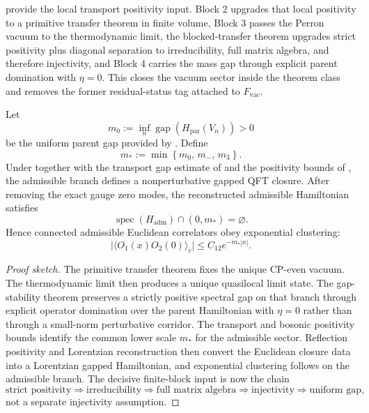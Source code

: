 \begin{remark}
\label{rem:vacuum-honest-status}
 provide the local transport
positivity input. Block 2 upgrades that local positivity to a primitive transfer theorem in finite
volume, Block 3 passes the Perron vacuum to the thermodynamic limit, the blocked-transfer theorem
upgrades strict positivity plus diagonal separation to irreducibility, full matrix algebra, and
therefore injectivity, and Block 4 carries the mass gap through explicit parent domination with
$\eta=0$. This closes the vacuum sector inside the theorem class and removes the former
residual-status tag attached to $F_{\mathrm{vac}}$.
\end{remark}

\begin{theorem}
\label{thm:nonperturbative-admissible-qft}
Let
\[
m_0:=\inf_n \operatorname{gap}(H_{\mathrm{par}}(V_n))>0
\]
be the uniform parent gap provided by . Define
\[
m_*:=\min\left\{m_0,\,m_-,\,m_3\right\}.
\]
Under 
together with the transport gap estimate of  and the positivity
bounds of , the admissible branch defines a nonperturbative
gapped QFT closure. After removing the exact gauge zero modes, the reconstructed admissible
Hamiltonian satisfies
\[
\operatorname{spec}(H_{\mathrm{adm}})\cap(0,m_*)=\varnothing.
\]
Hence connected admissible Euclidean correlators obey exponential clustering:
\[
\bigl|\langle O_1(x)O_2(0)\rangle_c\bigr|
\le
C_{12}e^{-m_*|x|}.
\]
\end{theorem}

\begin{proof}[Proof sketch]
The primitive transfer theorem fixes the unique CP-even vacuum. The thermodynamic limit then
produces a unique quasilocal limit state. The gap-stability theorem preserves a strictly positive
spectral gap on that branch through explicit operator domination over the parent Hamiltonian with
$\eta=0$ rather than through a small-norm perturbative corridor. The transport and bosonic
positivity bounds identify the common lower scale $m_*$ for the admissible sector. Reflection
positivity and Lorentzian reconstruction then convert the Euclidean closure data into a Lorentzian
gapped Hamiltonian, and exponential clustering follows on the admissible branch. The decisive
finite-block input is now the chain
\[
\text{strict positivity}\Rightarrow\text{irreducibility}\Rightarrow\text{full matrix algebra}
\Rightarrow\text{injectivity}\Rightarrow\text{uniform gap},
\]
not a separate injectivity assumption.
\end{proof}

